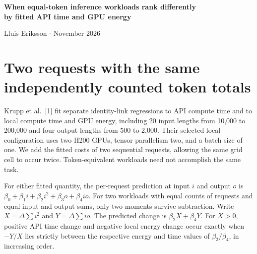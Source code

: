 \documentclass[11pt]{article}
\begin{document}
\begin{center}
{\Large\bfseries When equal-token inference workloads rank differently\\[2pt] by fitted API time and GPU energy}\par
\vspace{5pt} Lluis Eriksson \quad$\cdot$ November 2026
\end{center}

\begin{abstract}
We compare sums of fitted compute time and GPU energy for two-request workloads built from the Mistral-Small-2603 grid of Krupp et al. Among 28,160 comparisons with identical input and output token totals, 2,609 give opposite rankings for API time and local H200 energy. Of these, 2,574 survive rounding of the printed coefficients. The most robust fixed comparison retains both signs under a common relative cell-error bound below a critical value of approximately 1.8166\%. Conversely, a single perturbation of at most 2.193\% per cell makes all rankings agree. These are deterministic tests of fitted surfaces; the public coefficient table supplies neither the realized cell errors nor provider energy measurements.
\end{abstract}

\section*{Two requests with the same independently counted token totals}
Krupp et al.\ [1] fit separate identity-link regressions to API compute time and to local compute time and GPU energy, including 20 input lengths from 10,000 to 200,000 and four output lengths from 500 to 2,000. Their selected local configuration uses two H200 GPUs, tensor parallelism two, and a batch size of one. We add the fitted costs of two sequential requests, allowing the same grid cell to occur twice. Token-equivalent workloads need not accomplish the same task.

For either fitted quantity, the per-request prediction at input $i$ and output $o$ is $\beta_0+\beta_1 i+\beta_2 i^2+\beta_3 o+\beta_4 io$. For two workloads with equal counts of requests and equal input and output sums, only two moments survive subtraction. Write $X=\Delta\sum i^2$ and $Y=\Delta\sum io$. The predicted change is $\beta_2 X+\beta_4 Y$. For $X>0$, positive API time change and negative local energy change occur exactly when $-Y/X$ lies strictly between the respective energy and time values of $\beta_2/\beta_4$, in increasing order.
\end{document}
